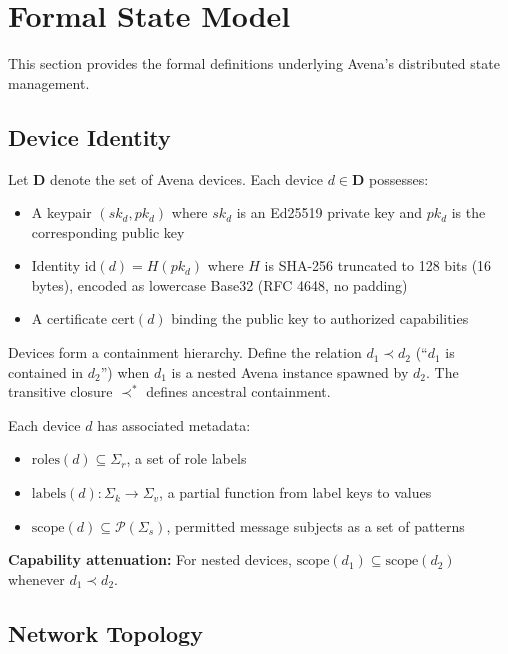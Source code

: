 
\section{Formal State Model}

This section provides the formal definitions underlying Avena's distributed state management.

\subsection{Device Identity}

Let $\mathbf{D}$ denote the set of Avena devices. Each device $d \in \mathbf{D}$ possesses:
\begin{itemize}
    \item A keypair $(sk_d, pk_d)$ where $sk_d$ is an Ed25519 private key and $pk_d$ is the corresponding public key
    \item Identity $\text{id}(d) = H(pk_d)$ where $H$ is SHA-256 truncated to 128 bits (16 bytes), encoded as lowercase Base32 (RFC 4648, no padding)
    \item A certificate $\text{cert}(d)$ binding the public key to authorized capabilities
\end{itemize}

Devices form a containment hierarchy. Define the relation $d_1 \prec d_2$ (``$d_1$ is contained in $d_2$'') when $d_1$ is a nested Avena instance spawned by $d_2$. The transitive closure $\prec^*$ defines ancestral containment.

Each device $d$ has associated metadata:
\begin{itemize}
    \item $\text{roles}(d) \subseteq \Sigma_r$, a set of role labels
    \item $\text{labels}(d) : \Sigma_k \to \Sigma_v$, a partial function from label keys to values
    \item $\text{scope}(d) \subseteq \mathcal{P}(\Sigma_s)$, permitted message subjects as a set of patterns
\end{itemize}

\textbf{Capability attenuation:} For nested devices, $\text{scope}(d_1) \subseteq \text{scope}(d_2)$ whenever $d_1 \prec d_2$.

\subsection{Network Topology}

